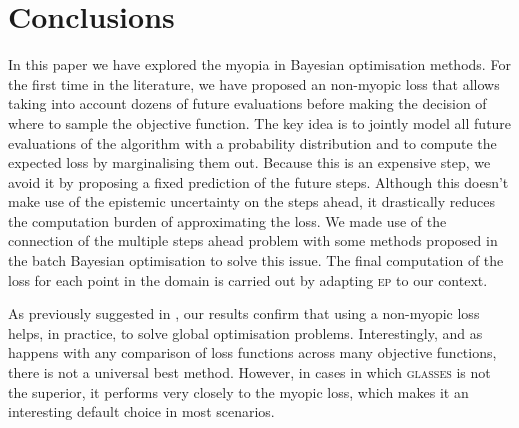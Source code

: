 \documentclass[twoside]{article}
\newcommand{\acr}[1]{\textsc{#1}\xspace}
\newcommand{\us}{\acr{glasses}}
\newcommand{\ep}{\acr{ep}}
\begin{document}


\section{Conclusions}\label{sec:conclusions}

In this paper we have explored the myopia in Bayesian optimisation methods. For the first time in the literature, we have proposed an non-myopic loss that allows taking into account dozens of future evaluations before making the decision of where to sample the objective function. The key idea is to jointly model all future evaluations of the algorithm with a probability distribution and to compute the expected loss by marginalising them out. Because this is an expensive step, we avoid it by proposing a fixed prediction of the future steps. Although this doesn't make use of the epistemic uncertainty on the steps ahead, it drastically reduces the computation burden of approximating the loss. We made use of the connection of the multiple steps ahead problem with some methods proposed in the batch Bayesian optimisation to solve this issue. The final computation of the loss for each point in the domain is carried out by adapting \ep to our context. 

As previously suggested in \cite{osborne_gaussian_2009}, our results confirm that using a non-myopic loss helps, in practice, to solve global optimisation problems. Interestingly, and as happens with any comparison of loss functions across many objective functions, there is not a universal best method. However, in cases in which \us is not the superior, it performs very closely to the myopic loss, which makes it an interesting default choice in most scenarios. 
\end{document}
